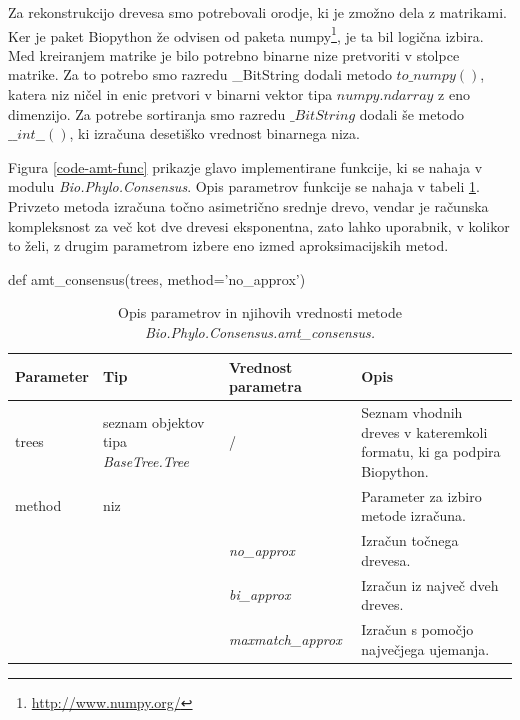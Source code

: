 \documentclass[a4paper, 12pt]{book}
\begin{document}
Za rekonstrukcijo drevesa smo potrebovali orodje, ki je zmožno dela z matrikami. Ker je paket Biopython že odvisen od paketa numpy\footnote{\url{http://www.numpy.org/}}, je ta bil logična izbira. Med kreiranjem matrike je bilo potrebno binarne nize pretvoriti v stolpce matrike. Za to potrebo smo razredu \_BitString dodali metodo $to\_numpy()$, katera niz ničel in enic pretvori v binarni vektor tipa $numpy.ndarray$ z eno dimenzijo. Za potrebe sortiranja smo razredu $\_BitString$ dodali še metodo $\_\_int\_\_()$, ki izračuna desetiško vrednost binarnega niza.

Figura \ref{code-amt-func} prikazje glavo implementirane funkcije, ki se nahaja v modulu {\it Bio.Phylo.Consensus}. Opis parametrov funkcije se nahaja v tabeli \ref{table-amt-head}. Privzeto metoda izračuna točno asimetrično srednje drevo, vendar je računska kompleksnost za več kot dve drevesi eksponentna, zato lahko uporabnik, v kolikor to želi, z drugim parametrom izbere eno izmed aproksimacijskih metod. 

\begin{python}[label={code-amt-func}, caption={Glava funkcije za izračun asimetričnega srednjega drevesa iz modula {\it Bio.Phylo.Consensus}.}]
def amt_consensus(trees, method='no_approx')
\end{python}

\begin{table}
	\begin{center}
	{\footnotesize
    \begin{tabular}{ >{\centering}m{1.7cm} | >{\centering}m{2.9cm} | >{\centering}m{2.6cm} | >{\centering}m{4cm} } 
    Parameter & Tip                             & Vrednost parametra                        & Opis   \tabularnewline
    \hline
    trees     & seznam objektov tipa {\it BaseTree.Tree}           & /                            & Seznam vhodnih dreves v kateremkoli formatu, ki ga podpira Biopython.  \tabularnewline
    \hline
    \hline
    method    & niz                             &  ~                                         & Parameter za izbiro metode izračuna.  \tabularnewline
    ~         & ~                               & {\it no\_approx}                            & Izračun točnega drevesa.  \tabularnewline
    ~         & ~                               & {\it bi\_approx}                            & Izračun iz največ dveh dreves.  \tabularnewline
    ~         & ~                               & {\it maxmatch\_approx}                      & Izračun s pomočjo največjega ujemanja.  \tabularnewline
    \hline
    \end{tabular}
    }
    \caption{Opis parametrov in njihovih vrednosti metode {\it Bio.Phylo.Consensus.amt\_consensus.}}
    \label{table-amt-head}
	\end{center}    
\end{table}
\end{document}
